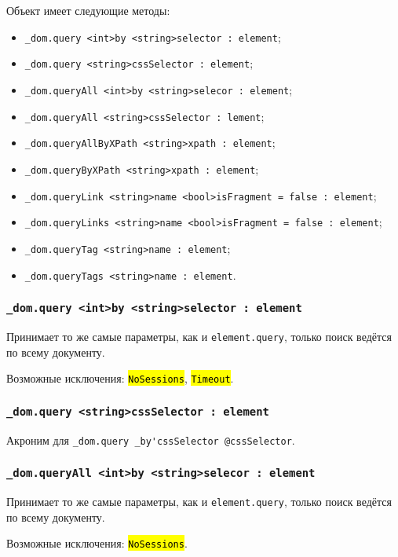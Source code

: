 \documentclass[a4paper, 14pt]{extarticle}
\newcommand{\ferror}[1]{{\fontsize{11pt}{12pt}\tt{\sethlcolor{yellow}\hl{#1}}}}
\newenvironment{icItems}
	{ \begin{itemize} [noitemsep,nolistsep] }
	{ \end{itemize} }
\begin{document}
Объект \dom{} имеет следующие методы:
\begin{icItems}
	\item \lstinline|_dom.query <int>by <string>selector : element|;
	\item \lstinline|_dom.query <string>cssSelector : element|;
	\item \lstinline|_dom.queryAll <int>by <string>selecor : element|;
	\item \lstinline|_dom.queryAll <string>cssSelector : lement|;
	\item \lstinline|_dom.queryAllByXPath <string>xpath : element|;
	\item \lstinline|_dom.queryByXPath <string>xpath : element|;
	\item \lstinline|_dom.queryLink <string>name <bool>isFragment = false : element|;
	\item \lstinline|_dom.queryLinks <string>name <bool>isFragment = false : element|;
	\item \lstinline|_dom.queryTag <string>name : element|;
	\item \lstinline|_dom.queryTags <string>name : element|.
\end{icItems}

\subsubsection{\lstinline|_dom.query <int>by <string>selector : element|}

Принимает то же самые параметры, как и \lstinline|element.query|, только поиск ведётся по всему документу.

Возможные исключения: \ferror{NoSessions}, \ferror{Timeout}.

\subsubsection{\lstinline|_dom.query <string>cssSelector : element|}

Акроним для \lstinline|_dom.query _by'cssSelector @cssSelector|.

\subsubsection{\lstinline|_dom.queryAll <int>by <string>selecor : element|}

Принимает то же самые параметры, как и \lstinline|element.query|, только поиск ведётся по всему документу.

Возможные исключения: \ferror{NoSessions}.
\end{document}

